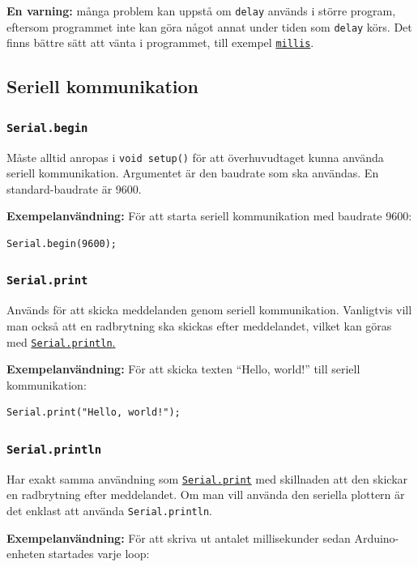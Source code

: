 \documentclass[11pt]{article}
\begin{document}
\textbf{En varning:} många problem kan uppstå om \texttt{delay} används i
större
program, eftersom programmet inte kan göra något annat under tiden som
\texttt{delay} körs. Det finns bättre sätt att vänta i programmet, till exempel
\hyperref[sec:millis]{\texttt{millis}}.

\subsection{Seriell kommunikation}
\subsubsection{\texttt{Serial.begin}}
Måste alltid anropas i \texttt{void setup()} för att överhuvudtaget kunna
använda seriell kommunikation. Argumentet är den baudrate som ska användas. En
standard-baudrate är 9600.

\textbf{Exempelanvändning:}
För att starta seriell kommunikation med baudrate 9600:
\begin{lstlisting}
Serial.begin(9600);
\end{lstlisting}

\subsubsection{\texttt{Serial.print}}\label{sec:serial.print}
Används för att skicka meddelanden genom seriell kommunikation. Vanligtvis vill
man också att en radbrytning ska skickas efter meddelandet, vilket kan göras
med \hyperref[sec:serial.println]{\texttt{Serial.println}.}

\textbf{Exempelanvändning:}
För att skicka texten ``Hello, world!'' till seriell kommunikation:
\begin{lstlisting}
Serial.print("Hello, world!");
\end{lstlisting}

\subsubsection{\texttt{Serial.println}} \label{sec:serial.println}
Har exakt samma användning som
\hyperref[sec:serial.print]{\texttt{Serial.print}} med skillnaden att den
skickar en radbrytning efter meddelandet. Om man vill använda den seriella
plottern är det enklast att använda \texttt{Serial.println}.

\textbf{Exempelanvändning:}
För att skriva ut antalet millisekunder sedan Arduino-enheten startades varje
loop:
\end{document}
